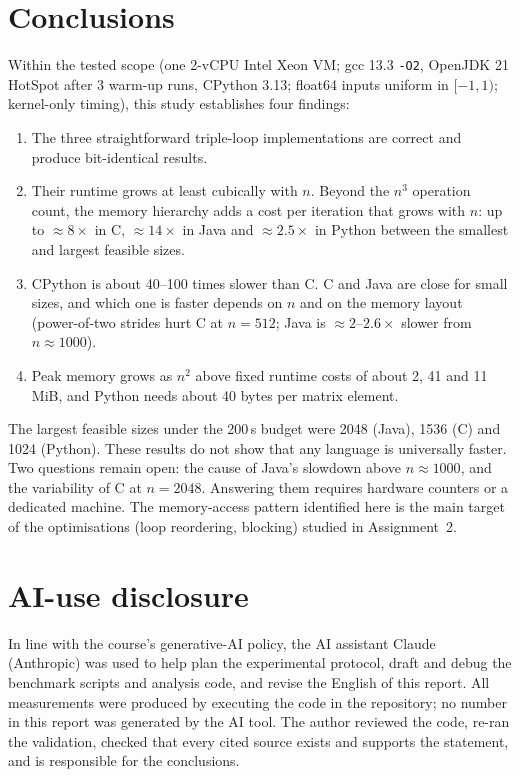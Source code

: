 \documentclass[10pt,a4paper]{article}
\begin{document}
\section{Conclusions}
Within the tested scope (one 2-vCPU Intel Xeon VM; gcc 13.3 \texttt{-O2}, OpenJDK 21
HotSpot after 3 warm-up runs, CPython 3.13; float64 inputs uniform in $[-1,1)$; kernel-only
timing), this study establishes four findings:
\begin{enumerate}
\item The three straightforward triple-loop implementations are correct and produce
bit-identical results.
\item Their runtime grows at least cubically with $n$. Beyond the $n^3$ operation count, the
memory hierarchy adds a cost per iteration that grows with $n$: up to $\approx8\times$ in C,
$\approx14\times$ in Java and $\approx2.5\times$ in Python between the smallest and largest
feasible sizes.
\item CPython is about 40--100 times slower than C. C and Java are close for small sizes, and
which one is faster depends on $n$ and on the memory layout (power-of-two strides hurt C at
$n=512$; Java is $\approx2$--$2.6\times$ slower from $n\approx1000$).
\item Peak memory grows as $n^2$ above fixed runtime costs of about 2, 41 and 11\,MiB, and Python
needs about 40 bytes per matrix element.
\end{enumerate}
The largest feasible sizes under the 200\,s budget were 2048 (Java), 1536 (C) and 1024
(Python). These results do not show that any language is universally faster. Two questions
remain open: the cause of Java's slowdown above $n\approx1000$, and the variability of C at
$n=2048$. Answering them requires hardware counters or a dedicated machine. The memory-access
pattern identified here is the main target of the optimisations (loop reordering, blocking)
studied in Assignment~2.

\section*{AI-use disclosure}
In line with the course's generative-AI policy, the AI assistant Claude (Anthropic) was used
to help plan the experimental protocol, draft and debug the benchmark scripts and analysis
code, and revise the English of this report. All measurements were produced by executing the
code in the repository; no number in this report was generated by the AI tool. The author
reviewed the code, re-ran the validation, checked that every cited source exists and supports
the statement, and is responsible for the conclusions.
\end{document}
